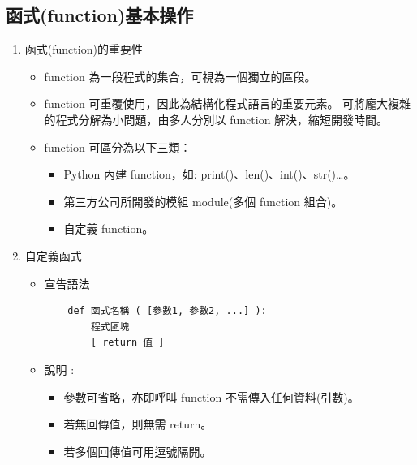 \documentclass[a4paper,12pt]{article}
\begin{document}
\subsection{函式(function)基本操作}
\label{sec:org54bc486}
\begin{enumerate}
\item 函式(function)的重要性
\label{sec:org6bf4e30}
\begin{itemize}
\item function 為一段程式的集合，可視為一個獨立的區段。\\
\item function 可重覆使用，因此為結構化程式語言的重要元素。 可將龐大複雜的程式分解為小問題，由多人分別以 function 解決，縮短開發時間。\\
\item function 可區分為以下三類：\\
\begin{itemize}
\item Python 內建 function，如: print()、len()、int()、str()\ldots{}。\\
\item 第三方公司所開發的模組 module(多個 function 組合)。\\
\item 自定義 function。\\
\end{itemize}
\end{itemize}

\item 自定義函式
\label{sec:org17bb60d}
\begin{itemize}
\item 宣告語法\\
\lstset{breaklines=true,language=Python,label= ,caption= ,captionpos=b,firstnumber=1,numbers=left}
\begin{lstlisting}
    def 函式名稱 ( [參數1, 參數2, ...] ):
        程式區塊 
        [ return 值 ]
\end{lstlisting}
\item 說明 :\\
\begin{itemize}
\item 參數可省略，亦即呼叫 function 不需傳入任何資料(引數)。\\
\item 若無回傳值，則無需 return。\\
\item 若多個回傳值可用逗號隔開。\\
\end{itemize}
\end{itemize}


\end{enumerate}
\end{document}
